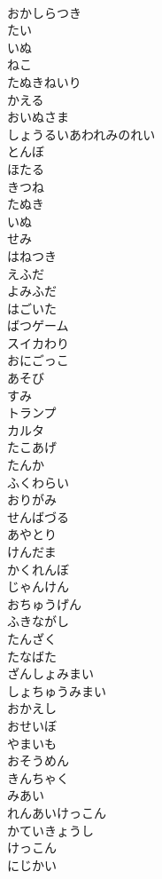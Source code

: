 \documentclass[8pt]{extreport}
\begin{document}
\begin{CJK}{UTF8}{min}
\\	おかしらつき
\\	たい
\\	いぬ
\\	ねこ
\\	たぬきねいり
\\	かえる
\\	おいぬさま
\\	しょうるいあわれみのれい
\\	とんぼ
\\	ほたる
\\	きつね
\\	たぬき
\\	いぬ
\\	せみ
\\	はねつき
\\	えふだ
\\	よみふだ
\\	はごいた
\\	ばつゲーム
\\	スイカわり
\\	おにごっこ
\\	あそび
\\	すみ
\\	トランプ
\\	カルタ
\\	たこあげ
\\	たんか
\\	ふくわらい
\\	おりがみ
\\	せんばづる
\\	あやとり
\\	けんだま
\\	かくれんぼ
\\	じゃんけん
\\	おちゅうげん
\\	ふきながし
\\	たんざく
\\	たなばた
\\	ざんしょみまい
\\	しょちゅうみまい
\\	おかえし
\\	おせいぼ
\\	やまいも
\\	おそうめん
\\	きんちゃく
\\	みあい
\\	れんあいけっこん
\\	かていきょうし
\\	けっこん
\\	にじかい

\end{CJK}
\end{document}
